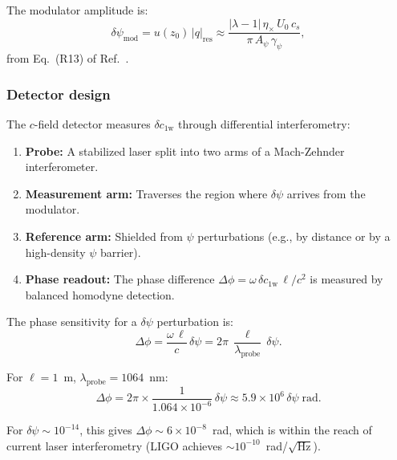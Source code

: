 \documentclass[aps,prd,twocolumn,superscriptaddress,nofootinbib,floatfix]{revtex4-2}
\newcommand{\psifield}{\psi}
\newcommand{\cfield}{c_{\text{1w}}}
\newcommand{\cvac}{c}
\newcommand{\ee}[1]{\times 10^{#1}}
\begin{document}
The modulator amplitude is:
\begin{equation}
\delta\psifield_{\text{mod}} = u(z_0)\,|q|_{\text{res}}
\approx \frac{|\lambda-1|\,\eta_\times\,U_0\,c_s}
{\pi\,A_\psi\,\gamma_\psi},
\label{eq:modulator_amplitude}
\end{equation}
from Eq.~(R13) of Ref.~\cite{Alcock2025DFD}.

\subsubsection{Detector design}

The $c$-field detector measures $\delta\cfield$ through
differential interferometry:

\begin{enumerate}
\item \textbf{Probe:} A stabilized laser split into two arms of
a Mach-Zehnder interferometer.

\item \textbf{Measurement arm:} Traverses the region where
$\delta\psifield$ arrives from the modulator.

\item \textbf{Reference arm:} Shielded from $\psifield$
perturbations (e.g., by distance or by a high-density
$\psifield$ barrier).

\item \textbf{Phase readout:} The phase difference
$\Delta\phi = \omega\,\delta\cfield\,\ell/\cvac^2$ is
measured by balanced homodyne detection.
\end{enumerate}

The phase sensitivity for a $\delta\psifield$ perturbation is:
\begin{equation}
\Delta\phi = \frac{\omega\,\ell}{\cvac}\,\delta\psifield
= 2\pi\,\frac{\ell}{\lambda_{\text{probe}}}\,\delta\psifield.
\label{eq:phase_sensitivity}
\end{equation}

For $\ell = 1$~m, $\lambda_{\text{probe}} = 1064$~nm:
\begin{equation}
\Delta\phi = 2\pi\times\frac{1}{1.064\ee{-6}}\,\delta\psifield
\approx 5.9\ee{6}\,\delta\psifield\;\text{rad}.
\label{eq:phase_numerical}
\end{equation}

For $\delta\psifield \sim 10^{-14}$, this gives
$\Delta\phi \sim 6\ee{-8}$~rad, which is within the reach of
current laser interferometry (LIGO achieves
$\sim 10^{-10}$~rad/$\sqrt{\text{Hz}}$).
\end{document}

